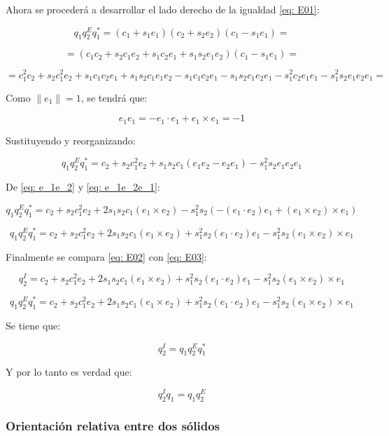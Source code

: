 \documentclass[10pt, a4paper]{report}
\begin{document}
Ahora se procederá a desarrollar el lado derecho de la igualdad \eqref{eq: E01}:

$$ q_1q_2^Eq_1^* = (c_1 + s_1 e_1)(c_2 + s_2 e_2)(c_1 - s_1 e_1) = $$

$$ = (c_1c_2 + s_2c_1e_2 + s_1c_2e_1 + s_1s_2e_1e_2)(c_1 - s_1 e_1) = $$

$$ = c_1^2c_2 + s_2c_1^2e_2 + s_1c_1c_2e_1 + s_1s_2c_1e_1e_2 - s_1c_1c_2e_1 - s_1s_2c_1e_2e_1 - s_1^2c_2e_1e_1 - s_1^2s_2e_1e_2e_1  = $$

Como $\|e_1\| = 1$, se tendrá que:

\begin{equation}
e_1e_1 = -e_1 \cdot e_1 + e_1 \times e_1 = -1
\end{equation}

Sustituyendo y reorganizando:

$$ q_1q_2^Eq_1^* = c_2 + s_2c_1^2e_2 + s_1s_2c_1(e_1e_2 - e_2e_1) - s_1^2s_2e_1e_2e_1 $$

De \eqref{eq: e_1e_2} y \eqref{eq: e_1e_2e_1}:

$$ q_1q_2^Eq_1^* = c_2 + s_2c_1^2e_2 + 2s_1s_2c_1(e_1 \times e_2) - s_1^2s_2(-(e_1 \cdot e_2)e_1 + (e_1 \times e_2) \times e_1) $$

\begin{equation} \label{eq: E03}
q_1q_2^Eq_1^* = c_2 + s_2c_1^2e_2 + 2s_1s_2c_1(e_1 \times e_2) + s_1^2s_2(e_1 \cdot e_2)e_1 - s_1^2s_2(e_1 \times e_2) \times e_1
\end{equation}

Finalmente se compara \eqref{eq: E02} con \eqref{eq: E03}:

$$ q_2^I = c_2 + s_2c_1^2e_2 + 2s_1s_2c_1(e_1 \times e_2) + s_1^2s_2(e_1 \cdot e_2)e_1 - s_1^2s_2(e_1 \times e_2) \times e_1 $$

$$ q_1q_2^Eq_1^* = c_2 + s_2c_1^2e_2 + 2s_1s_2c_1(e_1 \times e_2) + s_1^2s_2(e_1 \cdot e_2)e_1 - s_1^2s_2(e_1 \times e_2) \times e_1 $$

Se tiene que:

$$ q_2^I = q_1q_2^Eq_1^* $$

Y por lo tanto es verdad que:

\begin{equation}
q_2^Iq_1 = q_1q_2^E
\end{equation}

\subsubsection{Orientación relativa entre dos sólidos}
\end{document}
